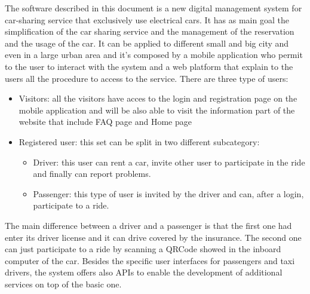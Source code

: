 The software described in this document is a new digital management system for car-sharing service that exclusively use electrical cars. It has as main goal the simplification of the car sharing service and the management of the reservation and the usage of the car. It can be applied to different small and big city and even in a large urban area and it's composed by a mobile application who permit to the user to interact with the system and a web platform that explain to the users all the procedure to access to the service. 
There are three type of users:
\begin{itemize}
	\item Visitors: all the visitors have acces to the login and registration page on the mobile application and will be also able to visit the information part of the website that include FAQ page and Home page
	\item Registered user: this set can be split in two different subcategory:
		\begin{itemize}
			\item Driver: this user can rent a car, invite other user to participate in the ride and finally can report problems.
			\item Passenger: this type of user is invited by the driver and can, after a login, participate to a ride. 
		\end{itemize}
\end{itemize}
The main difference between a driver and a passenger is that the first one had enter its driver license and it can drive covered by the insurance. The second one can just participate to a ride by scanning a QRCode showed in the inboard computer of the car.
Besides the specific user interfaces for passengers and taxi drivers, the system offers also APIs to enable the development of additional services on top of the basic one.